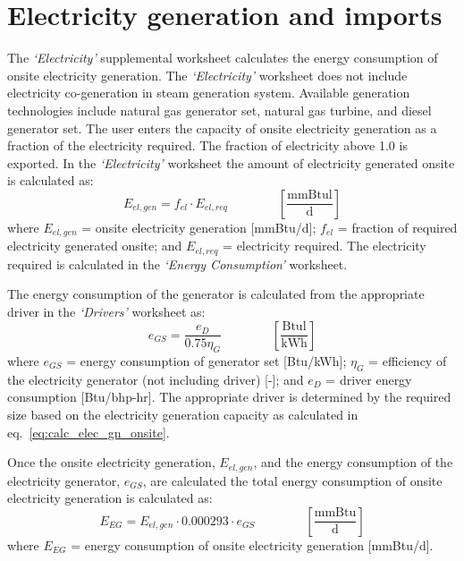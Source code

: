 \documentclass[11pt]{report}
\newcommand{\sheet}[1]{\textit{`{#1}'}}
\newcommand{\eqnunitfrac}[2]{\quad\quad \scriptstyle{\left[\frac{\text{#1}}{\text{#2}}\right]}}
\begin{document}
\clearpage

\section{Electricity generation and imports}
 \label{sec:ElectricityGeneration}

The \sheet{Electricity} supplemental worksheet calculates the energy consumption of onsite electricity generation. The \sheet{Electricity} worksheet does not include electricity co-generation in steam generation system. Available generation technologies include natural gas generator set, natural gas turbine, and diesel generator set. The user enters the capacity of onsite electricity generation as a fraction of the electricity required. The fraction of electricity above 1.0 is exported. In the \sheet{Electricity} worksheet the amount of electricity generated onsite is calculated as:
\begin{equation} \label{eq:calc_elec_gn_onsite}
E_{el,gen} = f_{el} \cdot E_{el,req}  \quad\quad\eqnunitfrac{mmBtul}{d}
\end{equation}
where $E_{el,gen}$ = onsite electricity generation [mmBtu/d]; $f_{el}$ = fraction of required electricity generated onsite; and $E_{el,req}$ = electricity required. The electricity required is calculated in the \sheet{Energy Consumption} worksheet.

The energy consumption of the generator is calculated from the appropriate driver in the \sheet{Drivers} worksheet as:
\begin{equation}
e_{GS} = \frac{e_{D}}{0.75 \eta_{G} } \quad\quad\eqnunitfrac{Btul}{kWh}
\end{equation}
where $e_{GS}$ = energy consumption of generator set [Btu/kWh]; $\eta_{G}$ = efficiency of the electricity generator (not including driver) [-]; and $e_{D}$ = driver energy consumption [Btu/bhp-hr]. The appropriate driver is determined by the required size based on the electricity generation capacity as calculated in eq.\ \eqref{eq:calc_elec_gn_onsite}.


Once the onsite electricity generation, $E_{el,gen}$, and the energy consumption of the electricity generator, $e_{GS}$, are calculated the total energy consumption of onsite electricity generation is calculated as:
\begin{equation}
E_{EG} = E_{el,gen} \cdot 0.000293 \cdot e_{GS} \quad\quad\eqnunitfrac{mmBtu}{d}
\end{equation}
where $E_{EG}$ = energy consumption of onsite electricity generation [mmBtu/d].
\end{document}
